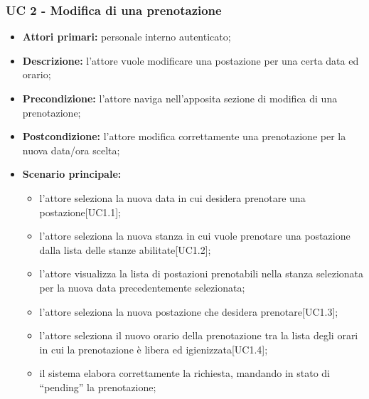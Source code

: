 

\subsubsection{UC 2 - Modifica di una prenotazione}

\begin{itemize}
\item \textbf{Attori primari:} personale interno autenticato;
\item \textbf{Descrizione:} l'attore vuole modificare una postazione per una certa data ed orario;
\item \textbf{Precondizione:} l'attore naviga nell’apposita sezione di modifica di una prenotazione;
\item \textbf{Postcondizione:} l'attore modifica correttamente una prenotazione per la nuova data/ora scelta;
\item \textbf{Scenario principale:} 
	\begin{itemize}
		\item l'attore seleziona la nuova data in cui desidera prenotare una postazione[UC1.1];
		\item l'attore seleziona la nuova stanza in cui vuole prenotare una postazione dalla lista delle stanze abilitate[UC1.2];
		\item l'attore visualizza la lista di postazioni prenotabili nella stanza selezionata per la nuova data precedentemente selezionata;
		\item l'attore seleziona la nuova postazione che desidera prenotare[UC1.3];
		\item l'attore seleziona il nuovo orario della prenotazione tra la lista degli orari in cui la prenotazione è libera ed igienizzata[UC1.4];
		\item il sistema elabora correttamente la richiesta, mandando in stato di “pending” la prenotazione;
	\end{itemize}
\end{itemize}

